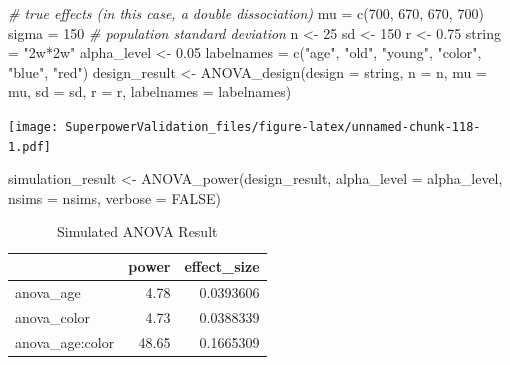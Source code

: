 \documentclass[
]{book}
\newenvironment{Shaded}{\begin{snugshade}}{\end{snugshade}}
\newcommand{\AttributeTok}[1]{\textcolor[rgb]{0.77,0.63,0.00}{#1}}
\newcommand{\CommentTok}[1]{\textcolor[rgb]{0.56,0.35,0.01}{\textit{#1}}}
\newcommand{\ConstantTok}[1]{\textcolor[rgb]{0.00,0.00,0.00}{#1}}
\newcommand{\DecValTok}[1]{\textcolor[rgb]{0.00,0.00,0.81}{#1}}
\newcommand{\FloatTok}[1]{\textcolor[rgb]{0.00,0.00,0.81}{#1}}
\newcommand{\FunctionTok}[1]{\textcolor[rgb]{0.00,0.00,0.00}{#1}}
\newcommand{\NormalTok}[1]{#1}
\newcommand{\OtherTok}[1]{\textcolor[rgb]{0.56,0.35,0.01}{#1}}
\newcommand{\StringTok}[1]{\textcolor[rgb]{0.31,0.60,0.02}{#1}}
\begin{document}
\begin{Shaded}
\begin{Highlighting}[]
\CommentTok{\# true effects (in this case, a double dissociation)}
\NormalTok{mu }\OtherTok{=} \FunctionTok{c}\NormalTok{(}\DecValTok{700}\NormalTok{, }\DecValTok{670}\NormalTok{, }\DecValTok{670}\NormalTok{, }\DecValTok{700}\NormalTok{) }
\NormalTok{sigma }\OtherTok{=} \DecValTok{150}  \CommentTok{\# population standard deviation}
\NormalTok{n }\OtherTok{\textless{}{-}} \DecValTok{25}
\NormalTok{sd }\OtherTok{\textless{}{-}} \DecValTok{150}
\NormalTok{r }\OtherTok{\textless{}{-}} \FloatTok{0.75}
\NormalTok{string }\OtherTok{=} \StringTok{"2w*2w"}
\NormalTok{alpha\_level }\OtherTok{\textless{}{-}} \FloatTok{0.05}
\NormalTok{labelnames }\OtherTok{=} \FunctionTok{c}\NormalTok{(}\StringTok{"age"}\NormalTok{, }\StringTok{"old"}\NormalTok{, }\StringTok{"young"}\NormalTok{, }\StringTok{"color"}\NormalTok{, }\StringTok{"blue"}\NormalTok{, }\StringTok{"red"}\NormalTok{)}
\NormalTok{design\_result }\OtherTok{\textless{}{-}} \FunctionTok{ANOVA\_design}\NormalTok{(}\AttributeTok{design =}\NormalTok{ string,}
                              \AttributeTok{n =}\NormalTok{ n, }
                              \AttributeTok{mu =}\NormalTok{ mu, }
                              \AttributeTok{sd =}\NormalTok{ sd, }
                              \AttributeTok{r =}\NormalTok{ r, }
                              \AttributeTok{labelnames =}\NormalTok{ labelnames)}
\end{Highlighting}
\end{Shaded}

\texttt{[image: SuperpowerValidation\_files/figure-latex/unnamed-chunk-118-1.pdf]}

\begin{Shaded}
\begin{Highlighting}[]
\NormalTok{simulation\_result }\OtherTok{\textless{}{-}} \FunctionTok{ANOVA\_power}\NormalTok{(design\_result, }
                                 \AttributeTok{alpha\_level =}\NormalTok{ alpha\_level, }
                                 \AttributeTok{nsims =}\NormalTok{ nsims,}
                                 \AttributeTok{verbose =} \ConstantTok{FALSE}\NormalTok{)}
\end{Highlighting}
\end{Shaded}

\begin{table}[!h]

\caption{\label{tab:unnamed-chunk-120}Simulated ANOVA Result}
\centering
\begin{tabular}[t]{l|r|r}
\hline
  & power & effect\_size\\
\hline
anova\_age & 4.78 & 0.0393606\\
\hline
anova\_color & 4.73 & 0.0388339\\
\hline
anova\_age:color & 48.65 & 0.1665309\\
\hline
\end{tabular}
\end{table}
\end{document}

